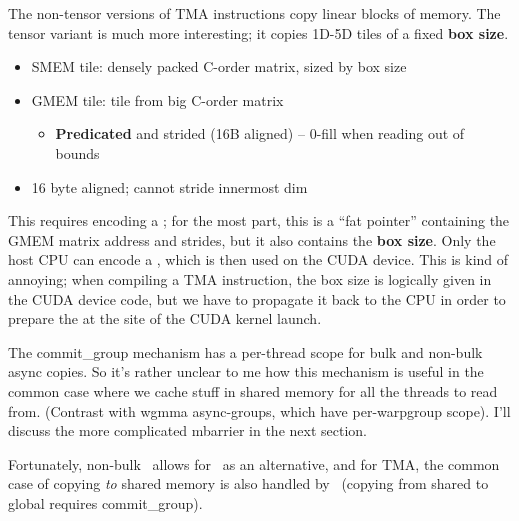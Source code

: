 \filbreak
The non-tensor versions of TMA instructions copy linear blocks of memory.
The tensor variant is much more interesting; it copies 1D-5D tiles of a fixed \textbf{box size}.

\begin{itemize}
\item SMEM tile: densely packed C-order matrix, sized by box size
\item GMEM tile: tile from big C-order matrix
\begin{itemize}
  \item \textbf{Predicated} and strided (16B aligned) -- 0-fill when reading out of bounds
\end{itemize}
\item 16 byte aligned; cannot stride innermost dim
\end{itemize}


This requires encoding a ; for the most part, this is a ``fat pointer'' containing the GMEM matrix address and strides, but it also contains the \textbf{box size}.
Only the host CPU can encode a , which is then used on the CUDA device.
This is kind of annoying; when compiling a TMA instruction, the box size is logically given in the CUDA device code, but we have to propagate it back to the CPU in order to prepare the  at the site of the CUDA kernel launch.

\filbreak
{} The commit\_group mechanism has a per-thread scope for bulk and non-bulk async copies. So it's rather unclear to me how this mechanism is useful in the common case where we cache stuff in shared memory for all the threads to read from. (Contrast with wgmma async-groups, which have per-warpgroup scope). I'll discuss the more complicated mbarrier in the next section.

Fortunately, non-bulk \cpAsync\ allows for \mbarrier\ as an alternative, and for TMA, the common case of copying \textit{to} shared memory is also handled by \mbarrier\ (copying from shared to global requires commit\_group).

